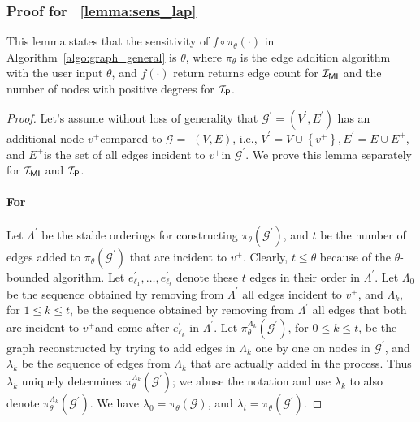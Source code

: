 \subsubsection{Proof for ~\cref{lemma:sens_lap}}
This lemma states that the sensitivity of $f\circ\pi_\theta(\cdot)$ in Algorithm~\ref{algo:graph_general} is $\theta$, where $\pi_\theta$ is the edge addition algorithm with the user input $\theta$, and $f(\cdot)$ return returns edge count for $\mathcal{I_{\mathsf{MI}}}$ and the number of nodes with positive degrees for $\mathcal{I_\mathsf{P}}$.

\begin{proof}
Let's assume without loss of generality that
$\mathcal{G}^{\prime}=\left(V^{\prime}, E^{\prime}\right)$ has an additional node $v^{+}$compared to $\mathcal{G}=$ $(V, E)$, i.e., $V^{\prime}=V \cup\left\{v^{+}\right\}, E^{\prime}=E \cup E^{+}$, and $E^{+}$is the set of all edges incident to $v^{+}$in $\mathcal{G}^{\prime}$. We prove this lemma separately for $\mathcal{I_{\mathsf{MI}}}$ and $\mathcal{I_\mathsf{P}}$.

\paragraph{For \mininconsistency}
Let $\Lambda^{\prime}$ be the stable orderings for constructing $\pi_\theta\left(\mathcal{G}^{\prime}\right)$, and $t$ be the number of edges added to $\pi_\theta\left(\mathcal{G}^{\prime}\right)$ that are incident to $v^{+}$. Clearly, $t \leq \theta$ because of the $\theta$-bounded algorithm. Let $e_{\ell_1}^{\prime}, \ldots, e_{\ell_t}^{\prime}$ denote these $t$ edges in their order in $\Lambda^{\prime}$. Let $\Lambda_0$ be the sequence obtained by removing from $\Lambda^{\prime}$ all edges incident to $v^{+}$, and $\Lambda_k$, for $1 \leq k \leq t$, be the sequence obtained by removing from $\Lambda^{\prime}$ all edges that both are incident to $v^{+}$and come after $e_{\ell_k}^{\prime}$ in $\Lambda^{\prime}$. Let $\pi_\theta^{\Lambda_k}\left(\mathcal{G}^{\prime}\right)$, for $0 \leq k \leq t$, be the graph reconstructed by trying to add edges in $\Lambda_k$ one by one on nodes in $\mathcal{G}^{\prime}$, and $\lambda_k$ be the sequence of edges from $\Lambda_k$ that are actually added in the process. Thus $\lambda_k$ uniquely determines $\pi_\theta^{\Lambda_k}\left(\mathcal{G}^{\prime}\right)$; we abuse the notation and use $\lambda_k$ to also denote $\pi_\theta^{\Lambda_k}\left(\mathcal{G}^{\prime}\right)$. We have $\lambda_0=\pi_\theta(\mathcal{G})$, and $\lambda_t=\pi_\theta\left(\mathcal{G}^{\prime}\right)$.


\end{proof}
